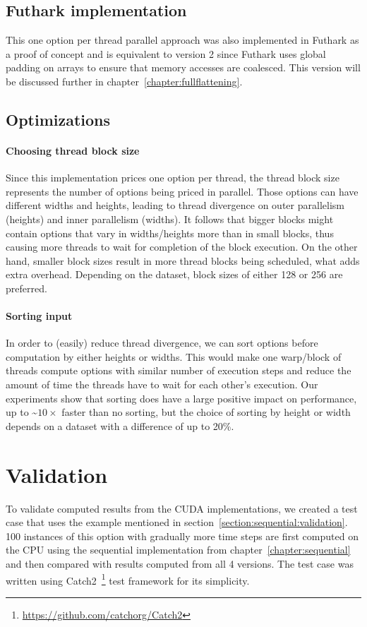 \subsection*{Futhark implementation}
This one option per thread parallel approach was also implemented in Futhark as a proof of concept and is equivalent to version 2 since Futhark uses global padding on arrays to ensure that memory accesses are coalesced. This version will be discussed further in chapter~\ref{chapter:fullflattening}.

\subsection*{Optimizations}
\paragraph{Choosing thread block size} 
Since this implementation prices one option per thread, the thread block size represents the number of options being priced in parallel. Those options can have different widths and heights, leading to thread divergence on outer parallelism (heights) and inner parallelism (widths). It follows that bigger blocks might contain options that vary in widths/heights more than in small blocks, thus causing more threads to wait for completion of the block execution. On the other hand, smaller block sizes result in more thread blocks being scheduled, what adds extra overhead. Depending on the dataset, block sizes of either 128 or 256 are preferred.

\paragraph{Sorting input}
In order to (easily) reduce thread divergence, we can sort options before computation by either heights or widths. This would make one warp/block of threads compute options with similar number of execution steps and reduce the amount of time the threads have to wait for each other's execution. Our experiments show that sorting does have a large positive impact on performance, up to \textasciitilde$10\times$ faster than no sorting, but the choice of sorting by height or width depends on a dataset with a difference of up to 20\%.

\section{Validation}\label{section:option:validation}
To validate computed results from the CUDA implementations, we created a test case that uses the example mentioned in section~\ref{section:sequential:validation}. 100 instances of this option with gradually more time steps are first computed on the CPU using the sequential implementation from chapter~\ref{chapter:sequential} and then compared with results computed from all 4 versions. The test case was written using Catch2~\footnote{\url{https://github.com/catchorg/Catch2}} test framework for its simplicity.

